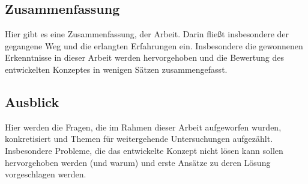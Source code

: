 \subsection{Zusammenfassung}
Hier gibt es eine Zusammenfassung, der Arbeit. Darin flie\ss t insbesondere der gegangene Weg und die erlangten Erfahrungen ein. Insbesondere die gewonnenen Erkenntnisse in dieser Arbeit werden hervorgehoben und die Bewertung des entwickelten Konzeptes in wenigen S\"atzen zusammengefasst.

\subsection{Ausblick}
Hier werden die Fragen, die im Rahmen dieser Arbeit aufgeworfen wurden, konkretisiert und Themen f\"ur weitergehende Untersuchungen aufgez\"ahlt. Insbesondere Probleme, die das entwickelte Konzept nicht l\"osen kann sollen hervorgehoben werden (und warum) und erste Ans\"atze zu deren L\"osung vorgeschlagen werden.